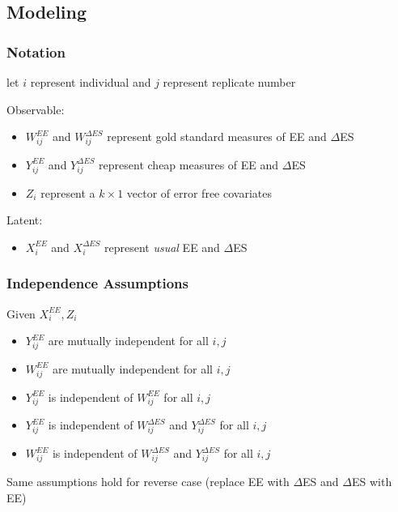 \documentclass[handout]{beamer}\usepackage[]{graphicx}\usepackage[]{color}
\begin{document}
\subsection{Modeling}

\begin{frame}
\frametitle{Notation}
let $i$ represent individual and $j$ represent replicate number \\

\vspace{0.3cm}

Observable:
\begin{itemize}
\item
$W_{ij}^{EE}$ and $W_{ij}^{\Delta ES}$ represent gold standard measures of EE and $\Delta$ES
\item
$Y_{ij}^{EE}$ and $Y_{ij}^{\Delta ES}$ represent cheap measures of EE and $\Delta$ES
\item
$Z_i$ represent a $k\times 1$ vector of error free covariates
\end{itemize}

\vspace{0.2cm}

Latent:
\begin{itemize}
\item
$X_{i}^{EE}$ and $X_{i}^{\Delta ES}$ represent \emph{usual} EE and $\Delta$ES

\end{itemize}

\end{frame}


\begin{frame}
\frametitle{Independence Assumptions}
Given $X_i^{EE}, Z_i$

\begin{itemize}
\item
$Y^{EE}_{ij}$ are mutually independent for all $i,j$ \\
\item
$W_{ij}^{EE}$ are mutually independent for all $i,j$ \\
\item
$Y_{ij}^{EE}$ is independent of $W_{ij}^{EE}$ for all $i,j$ \\
\item
$Y_{ij}^{EE}$ is independent of $W_{ij}^{\Delta ES}$ and $Y_{ij}^{\Delta ES}$ for all $i,j$ \\
\item
$W_{ij}^{EE}$ is independent of $W_{ij}^{\Delta ES}$ and $Y_{ij}^{\Delta ES}$ for all $i,j$ \\
\end{itemize}

\vspace{0.2cm}

Same assumptions hold for reverse case (replace EE with $\Delta$ES and $\Delta$ES with EE)


\end{frame}
\end{document}
